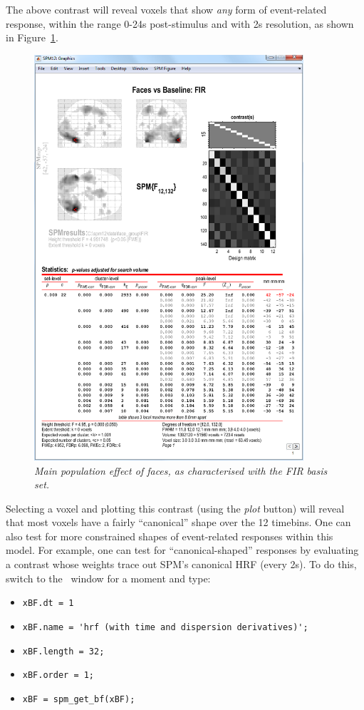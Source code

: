 The above contrast will reveal voxels that show \emph{any} form of event-related response, within the range 0-24s post-stimulus and with 2s resolution, as shown in Figure~\ref{fir_results}. 
\begin{figure}
\begin{center}
\includegraphics[width=100mm]{faces_group/fir_results}
\caption{\em Main population effect of faces, as characterised with the FIR basis set. \label{fir_results}}
\end{center}
\end{figure}
Selecting a voxel and plotting this contrast (using the \emph{plot} button) will reveal that most voxels have a fairly ``canonical'' shape over the 12 timebins.
One can also test for more constrained shapes of event-related responses within this model. For example, one can test for ``canonical-shaped'' responses by evaluating a contrast whose weights trace out SPM's canonical HRF (every 2s). To do this, switch to the \matlab\ window for a moment and type:
\begin{itemize}
\item \verb!xBF.dt = 1!
\item \verb!xBF.name = 'hrf (with time and dispersion derivatives)';!
\item \verb!xBF.length = 32;!
\item \verb!xBF.order = 1;!
\item \verb!xBF = spm_get_bf(xBF);!
\end{itemize}

